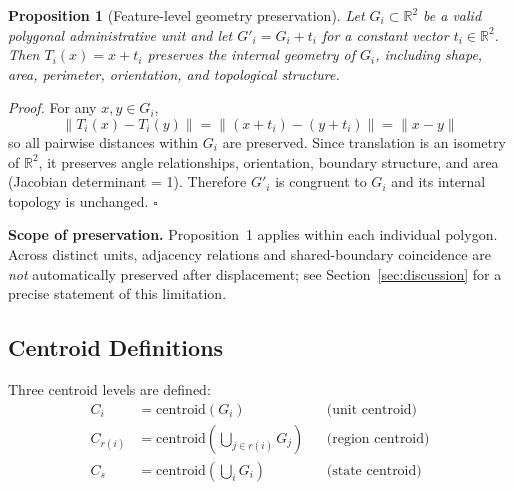 \documentclass[12pt, a4paper]{article}
\numberwithin{equation}{section}
\begin{document}
\begin{mdframed}[linecolor=blue!50!black, linewidth=1pt, topline=true, bottomline=true, rightline=false, leftline=false, innertopmargin=6pt, innerbottommargin=6pt]
\textbf{Proposition 1} (Feature-level geometry preservation). \textit{Let $G_i \subset \mathbb{R}^2$ be a valid polygonal administrative unit and let $G'_i = G_i + t_i$ for a constant vector $t_i \in \mathbb{R}^2$. Then $T_i(x) = x + t_i$ preserves the internal geometry of $G_i$, including shape, area, perimeter, orientation, and topological structure.}

\smallskip
\textit{Proof.} For any $x, y \in G_i$,
\[
  \|T_i(x) - T_i(y)\| = \|(x + t_i) - (y + t_i)\| = \|x - y\|
\]
so all pairwise distances within $G_i$ are preserved. Since translation is an isometry of $\mathbb{R}^2$, it preserves angle relationships, orientation, boundary structure, and area (Jacobian determinant = 1). Therefore $G'_i$ is congruent to $G_i$ and its internal topology is unchanged. $\square$
\end{mdframed}

\smallskip
\noindent\textbf{Scope of preservation.} Proposition~1 applies within each individual polygon. Across distinct units, adjacency relations and shared-boundary coincidence are \emph{not} automatically preserved after displacement; see Section~\ref{sec:discussion} for a precise statement of this limitation.

\subsection{Centroid Definitions}

Three centroid levels are defined:
\begin{align}
  C_i        &= \text{centroid}(G_i) & &\text{(unit centroid)} \label{eq:ci}\\
  C_{r(i)}   &= \text{centroid}\!\left(\bigcup_{j \in r(i)} G_j\right) & &\text{(region centroid)} \label{eq:cr}\\
  C_s        &= \text{centroid}\!\left(\bigcup_i G_i\right) & &\text{(state centroid)} \label{eq:cs}
\end{align}
\end{document}
